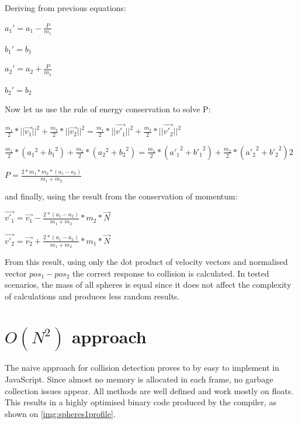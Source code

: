 Deriving from previous equations:

 \begin{center}
$a_1' =  a_1 - \frac{P}{m_1}$

$b_1' = b_1$

$a_2' =  a_2 + \frac{P}{m_2}$

$b_2' = b_2$
\end{center}

Now let us use the rule of energy conservation to solve P:

 \begin{center}
$\frac{m_1}{2} * ||\vec{v_1}||^2 + \frac{m_2}{2} * ||\vec{v_2}||^2 = \frac{m_1}{2} * ||\vec{v'_1}||^2 + \frac{m_2}{2} * ||\vec{v'_2}||^2$

$\frac{m_1}{2} * ({a_1}^2 + {b_1}^2) + \frac{m_2}{2} * ({a_2}^2 + {b_2}^2) = \frac{m_1}{2} * ({a'_1}^2 + {b'_1}^2) + \frac{m_2}{2} * ({a'_2}^2 + {b'_2}^2)2$

$P = \frac{2*m_1*m_2*(a_1-a_2)}{m_1+m_2}$
\end{center}

and finally, using the result from the conservation of momentum:

 \begin{center}
$\vec{v'_1} =  \vec{v_1} - \frac{2*(a_1-a_2)}{m_1+m_2} * m_2 * \vec{N}$

$\vec{v'_2} =  \vec{v_2} + \frac{2*(a_1-a_2)}{m_1+m_2} * m_1 * \vec{N}$
\end{center}

From this result, using only the dot product of velocity vectors and normalised vector $pos_1 - pos_2$ the correct response to collision is calculated. In tested scenarios, the mass of all spheres is equal since it does not affect the complexity of calculations and produces less random results.


\section{{$O(N^2)$} approach}
\label{sec:sphereinitial}

The naive approach for collision detection proves to by easy to implement in JavaScript. Since almost no memory is allocated in each frame, no garbage collection issues appear. All methods are well defined and work mostly on floats. This results in a highly optimised binary code produced by the compiler, as shown on \ref{img:spheres1profile}.

